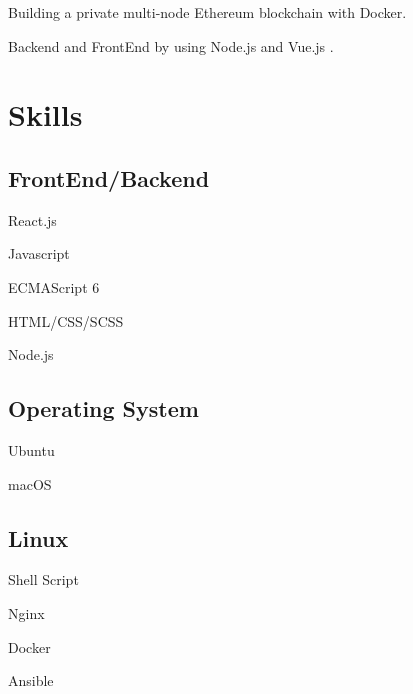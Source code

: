 \documentclass[]{deedy-resume-openfont}
\begin{document}
\begin{minipage}[t]{0.5\textwidth}
\begin{tightemize}
    \item Building a private multi-node Ethereum blockchain with Docker.
    \item Backend and FrontEnd by using Node.js and Vue.js .
\end{tightemize}

\sectionsep


\section{Skills}

\begin{minipage}[t]{0.45\textwidth}
    \subsection{FrontEnd/Backend}
    \vspace{\topsep}
    \begin{tightemize}
        \item React.js
        \item Javascript
        \item ECMAScript 6
        \item HTML/CSS/SCSS
        \item Node.js
    \end{tightemize}
\end{minipage}
\hfill
\begin{minipage}[t]{0.45\textwidth}
    \subsection{Operating System}
    \vspace{\topsep}
    \begin{tightemize}
        \item Ubuntu
        \item macOS
    \end{tightemize}
\end{minipage}

\vspace{\topsep}
\begin{minipage}[t]{0.45\textwidth}
    \subsection{Linux}
    \vspace{\topsep}
    \begin{tightemize}
        \item Shell Script
        \item Nginx
        \item Docker
        \item Ansible
    \end{tightemize}
\end{minipage}


\end{minipage}
\end{document}
